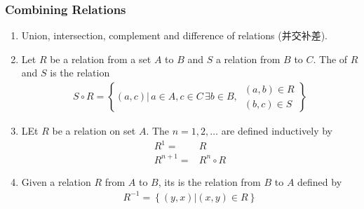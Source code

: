 \subsubsection{Combining Relations}
\begin{enumerate}
    \item Union, intersection, complement and difference of relations (并交补差). 
    \item Let $R$ be a relation from a set $A$ to $B$ and $S$ a relation from $B$ to $C$. The  of $R$ and $S$ is the relation
    \begin{align*}
        S \circ R =\left\{ (a,c)|\, a\in A,c\in C \,\exists b\in B ,\, \begin{array}{l}
            (a,b)\in R\\(b,c)\in S
        \end{array}  \right\}
    \end{align*}
    \item LEt $R$ be a relation on set $A$. The  $n=1,2,\dots$ are defined inductively by 
    \begin{align*}
        R^1=&R \\
        R^{n+1}=&R^n \circ R
    \end{align*}
    \item Given a relation $R$ from $A$ to $B$, its  is the relation from $B$ to $A$ defined by
    \begin{align*}
        R^{-1}=\left\{ (y,x)| (x,y)\in R \right\}
    \end{align*}
\end{enumerate}

\quad

